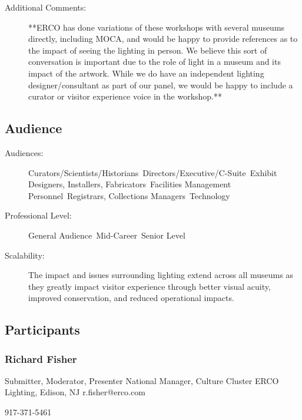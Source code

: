 \documentclass{report}
\begin{document}
\begin{description}
                    \item [Additional Comments: ]  **ERCO has done variations of these workshops with several museums directly, including MOCA, and would be happy to provide references as to the impact of seeing the lighting in person. We believe this sort of conversation is important due to the role of light in a museum and its impact of the artwork. While we do have an independent lighting designer/consultant as part of our panel, we would be happy to include a curator or visitor experience voice in the workshop.**
  

                \end{description}
              \subsection*{Audience}
                \begin{description}
                  \item [Audiences:]Curators/Scientists/Historians~Directors/Executive/C-Suite~Exhibit Designers, Installers, Fabricators~Facilities Management Personnel~Registrars, Collections Managers~Technology~
                  \item[Professional Level:]General Audience~Mid-Career~Senior Level~
                \item[Scalability:] The impact and issues surrounding lighting extend across all museums as they greatly impact visitor experience through better visual acuity, improved conservation, and reduced operational impacts.

							
              \end{description}
            \subsection*{Participants}
              \subsubsection*{ Richard Fisher }
              Submitter, Moderator, Presenter\newline
              National Manager, Culture Cluster\newline
              ERCO Lighting, Edison, NJ
              \newline
              r.fisher@erco.com\newline
              
              917-371-5461\newline
\end{document}
